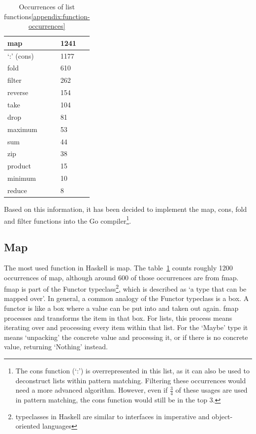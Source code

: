 \begin{table}[htb]
\centering
\begin{tabular}{ll}
\toprule
map & 1241 \\
\midrule
`:' (cons) & 1177 \\
\midrule
fold & 610 \\
\midrule
filter & 262 \\
\midrule
reverse & 154 \\
\midrule
take & 104 \\
\midrule
drop & 81 \\
\midrule
maximum & 53 \\
\midrule
sum & 44 \\
\midrule
zip & 38 \\
\midrule
product & 15 \\
\midrule
minimum & 10 \\
\midrule
reduce & 8
\end{tabular}
\caption{Occurrences of list functions\ref{appendix:function-occurrences}}\label{tab:occurrences-list-funcs}
\end{table}

Based on this information, it has been decided to implement the map, cons, fold
and filter functions into the Go compiler\footnote{The cons function (`:') is overrepresented in this list,
    as it can also be used to deconstruct lists within pattern matching. Filtering
    these occurrences would need a more advanced algorithm. However, even if $\tfrac{3}{4}$
    of these usages are used in pattern matching, the cons function would still be
    in the top 3.
}.

\subsection{Map}

The most used function in Haskell is map. The table~\ref{tab:occurrences-list-funcs}
counts roughly 1200 occurrences of map, although around 600 of those occurrences are from
fmap. fmap is part of the Functor typeclass\footnote{typeclasses
    in Haskell are similar to interfaces in imperative and object-oriented
languages}, which is described as `a type that can be mapped over'\autocite{functor-wiki}.
In general, a common analogy of the Functor typeclass is a box. A functor is like a box
where a value can be put into and taken out again. fmap processes and transforms the item
in that box. For lists, this process means iterating over and processing every item within that list.
For the `Maybe' type it means `unpacking' the concrete value and processing it, or if there is
no concrete value, returning `Nothing' instead.

